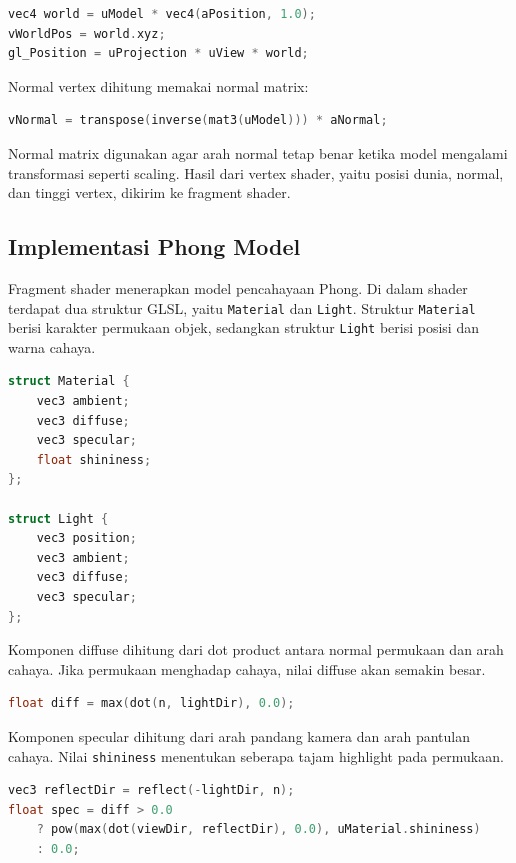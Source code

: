 \documentclass[12pt,a4paper]{article}
\begin{document}
\begin{lstlisting}[language=C++]
vec4 world = uModel * vec4(aPosition, 1.0);
vWorldPos = world.xyz;
gl_Position = uProjection * uView * world;
\end{lstlisting}

Normal vertex dihitung memakai normal matrix:

\begin{lstlisting}[language=C++]
vNormal = transpose(inverse(mat3(uModel))) * aNormal;
\end{lstlisting}

Normal matrix digunakan agar arah normal tetap benar ketika model mengalami
transformasi seperti scaling. Hasil dari vertex shader, yaitu posisi dunia,
normal, dan tinggi vertex, dikirim ke fragment shader.

\subsection{Implementasi Phong Model}

Fragment shader menerapkan model pencahayaan Phong. Di dalam shader terdapat
dua struktur GLSL, yaitu \texttt{Material} dan \texttt{Light}. Struktur
\texttt{Material} berisi karakter permukaan objek, sedangkan struktur
\texttt{Light} berisi posisi dan warna cahaya.

\begin{lstlisting}[language=C++]
struct Material {
    vec3 ambient;
    vec3 diffuse;
    vec3 specular;
    float shininess;
};

struct Light {
    vec3 position;
    vec3 ambient;
    vec3 diffuse;
    vec3 specular;
};
\end{lstlisting}

Komponen diffuse dihitung dari dot product antara normal permukaan dan arah
cahaya. Jika permukaan menghadap cahaya, nilai diffuse akan semakin besar.

\begin{lstlisting}[language=C++]
float diff = max(dot(n, lightDir), 0.0);
\end{lstlisting}

Komponen specular dihitung dari arah pandang kamera dan arah pantulan cahaya.
Nilai \texttt{shininess} menentukan seberapa tajam highlight pada permukaan.

\begin{lstlisting}[language=C++]
vec3 reflectDir = reflect(-lightDir, n);
float spec = diff > 0.0
    ? pow(max(dot(viewDir, reflectDir), 0.0), uMaterial.shininess)
    : 0.0;
\end{lstlisting}
\end{document}
